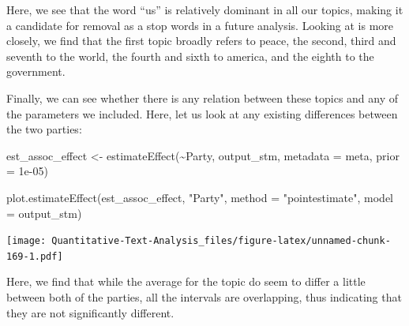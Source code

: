 \documentclass[
]{book}
\newenvironment{Shaded}{\begin{snugshade}}{\end{snugshade}}
\newcommand{\AttributeTok}[1]{\textcolor[rgb]{0.77,0.63,0.00}{#1}}
\newcommand{\FloatTok}[1]{\textcolor[rgb]{0.00,0.00,0.81}{#1}}
\newcommand{\FunctionTok}[1]{\textcolor[rgb]{0.00,0.00,0.00}{#1}}
\newcommand{\NormalTok}[1]{#1}
\newcommand{\OtherTok}[1]{\textcolor[rgb]{0.56,0.35,0.01}{#1}}
\newcommand{\SpecialCharTok}[1]{\textcolor[rgb]{0.00,0.00,0.00}{#1}}
\newcommand{\StringTok}[1]{\textcolor[rgb]{0.31,0.60,0.02}{#1}}
\begin{document}
Here, we see that the word ``us'' is relatively dominant in all our topics, making it a candidate for removal as a stop words in a future analysis. Looking at is more closely, we find that the first topic broadly refers to peace, the second, third and seventh to the world, the fourth and sixth to america, and the eighth to the government.

Finally, we can see whether there is any relation between these topics and any of the parameters we included. Here, let us look at any existing differences between the two parties:

\begin{Shaded}
\begin{Highlighting}[]
\NormalTok{est\_assoc\_effect }\OtherTok{\textless{}{-}} \FunctionTok{estimateEffect}\NormalTok{(}\SpecialCharTok{\textasciitilde{}}\NormalTok{Party, output\_stm, }\AttributeTok{metadata =}\NormalTok{ meta,}
    \AttributeTok{prior =} \FloatTok{1e{-}05}\NormalTok{)}
\end{Highlighting}
\end{Shaded}

\begin{Shaded}
\begin{Highlighting}[]
\FunctionTok{plot.estimateEffect}\NormalTok{(est\_assoc\_effect, }\StringTok{"Party"}\NormalTok{, }\AttributeTok{method =} \StringTok{"pointestimate"}\NormalTok{,}
    \AttributeTok{model =}\NormalTok{ output\_stm)}
\end{Highlighting}
\end{Shaded}

\texttt{[image: Quantitative-Text-Analysis\_files/figure-latex/unnamed-chunk-169-1.pdf]}

Here, we find that while the average for the topic do seem to differ a little between both of the parties, all the intervals are overlapping, thus indicating that they are not significantly different.
\end{document}
